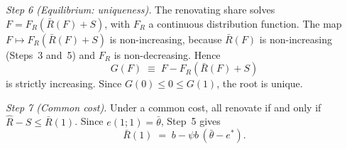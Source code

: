 \emph{Step 6 (Equilibrium: uniqueness).} The renovating share solves $F=F_R(\bar R(F)+S)$, with $F_R$ a continuous distribution function. The map $F\mapsto F_R(\bar R(F)+S)$ is non-increasing, because $\bar R(F)$ is non-increasing (Steps~3 and~5) and $F_R$ is non-decreasing. Hence
\begin{equation*}
    G(F)\;\equiv\;F-F_R(\bar R(F)+S)
\end{equation*}
is strictly increasing. Since $G(0)\le0\le G(1)$, the root is unique.

\emph{Step 7 (Common cost).} Under a common cost, all renovate if and only if $\hat R-S\le\bar R(1)$. Since $e(1;1)=\bar\theta$, Step~5 gives
\begin{equation*}
    \bar R(1)\;=\;b-\psi b\,(\bar\theta-e^*).
\end{equation*}
